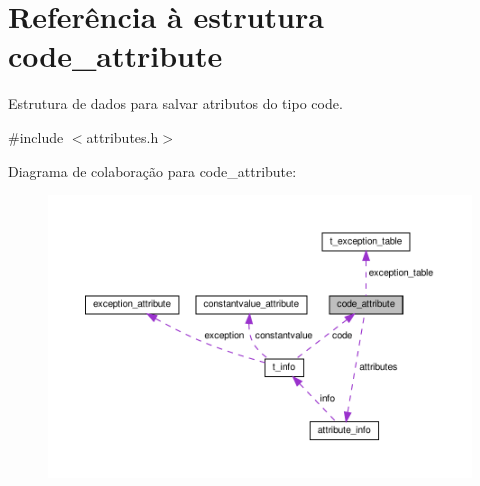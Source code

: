 \hypertarget{structcode__attribute}{}\section{Referência à estrutura code\+\_\+attribute}
\label{structcode__attribute}


Estrutura de dados para salvar atributos do tipo code.  




{\ttfamily \#include $<$attributes.\+h$>$}



Diagrama de colaboração para code\+\_\+attribute\+:
\nopagebreak
\begin{figure}[H]
\begin{center}
\leavevmode
\includegraphics[width=350pt]{structcode__attribute__coll__graph}
\end{center}
\end{figure}
